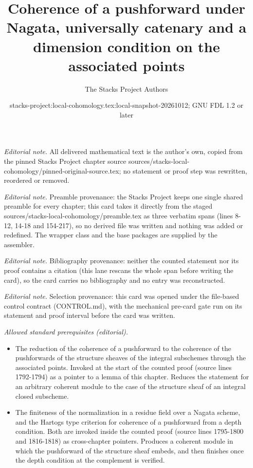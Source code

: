 \documentclass[10pt,a4paper]{amsart}
\title{Coherence of a pushforward under Nagata, universally catenary and a dimension condition on the associated points}
\author{The Stacks Project Authors}
\date{stacks-project:local-cohomology.tex:local-snapshot-20261012; GNU FDL 1.2 or later}
\theoremstyle{plain}
\theoremstyle{definition}
\theoremstyle{remark}
\numberwithin{equation}{subsection}
\begin{document}
\maketitle
\noindent\textit{Editorial note.} All delivered mathematical text is the author's own, copied from the pinned Stacks Project chapter source sources/stacks-local-cohomology/pinned-original-source.tex; no statement or proof step was rewritten, reordered or removed.\par\medskip
\noindent\textit{Editorial note.} Preamble provenance: the Stacks Project keeps one single shared preamble for every chapter; this card takes it directly from the staged sources/stacks-local-cohomology/preamble.tex as three verbatim spans (lines 8-12, 14-18 and 154-217), so no derived file was written and nothing was added or redefined. The wrapper class and the base packages are supplied by the assembler.\par\medskip
\noindent\textit{Editorial note.} Bibliography provenance: neither the counted statement nor its proof contains a citation (this lane rescans the whole span before writing the card), so the card carries no bibliography and no entry was reconstructed.\par\medskip
\noindent\textit{Editorial note.} Selection provenance: this card was opened under the file-based control contract (CONTROL.md), with the mechanical pre-card gate run on its statement and proof interval before the card was written.\par\medskip
\noindent\textit{Allowed standard prerequisites (editorial).}\begin{itemize}
\item The reduction of the coherence of a pushforward to the coherence of the pushforwards of the structure sheaves of the integral subschemes through the associated points. Invoked at the start of the counted proof (source lines 1792-1794) as a pointer to a lemma of this chapter. Reduces the statement for an arbitrary coherent module to the case of the structure sheaf of an integral closed subscheme.
\item The finiteness of the normalization in a residue field over a Nagata scheme, and the Hartogs type criterion for coherence of a pushforward from a depth condition. Both are invoked inside the counted proof (source lines 1795-1800 and 1816-1818) as cross-chapter pointers. Produces a coherent module in which the pushforward of the structure sheaf embeds, and then finishes once the depth condition at the complement is verified.
\end{itemize}\medskip
\end{document}
